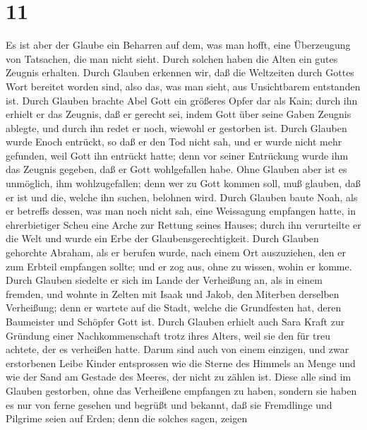 \hypertarget{section-10}{%
\section{11}\label{section-10}}

 Es ist aber der Glaube ein Beharren auf dem, was man
hofft, eine Überzeugung von Tatsachen, die man nicht sieht.
 Durch solchen haben die Alten ein gutes Zeugnis erhalten.
 Durch Glauben erkennen wir, daß die Weltzeiten durch
Gottes Wort bereitet worden sind, also das, was man sieht, aus
Unsichtbarem entstanden ist.  Durch Glauben brachte Abel
Gott ein größeres Opfer dar als Kain; durch ihn erhielt er das Zeugnis,
daß er gerecht sei, indem Gott über seine Gaben Zeugnis ablegte, und
durch ihn redet er noch, wiewohl er gestorben ist.  Durch
Glauben wurde Enoch entrückt, so daß er den Tod nicht sah, und er wurde
nicht mehr gefunden, weil Gott ihn entrückt hatte; denn vor seiner
Entrückung wurde ihm das Zeugnis gegeben, daß er Gott wohlgefallen habe.
 Ohne Glauben aber ist es unmöglich, ihm wohlzugefallen;
denn wer zu Gott kommen soll, muß glauben, daß er ist und die, welche
ihn suchen, belohnen wird.  Durch Glauben baute Noah, als
er betreffs dessen, was man noch nicht sah, eine Weissagung empfangen
hatte, in ehrerbietiger Scheu eine Arche zur Rettung seines Hauses;
durch ihn verurteilte er die Welt und wurde ein Erbe der
Glaubensgerechtigkeit.  Durch Glauben gehorchte Abraham,
als er berufen wurde, nach einem Ort auszuziehen, den er zum Erbteil
empfangen sollte; und er zog aus, ohne zu wissen, wohin er komme.
 Durch Glauben siedelte er sich im Lande der Verheißung
an, als in einem fremden, und wohnte in Zelten mit Isaak und Jakob, den
Miterben derselben Verheißung;  denn er wartete auf die
Stadt, welche die Grundfesten hat, deren Baumeister und Schöpfer Gott
ist.  Durch Glauben erhielt auch Sara Kraft zur Gründung
einer Nachkommenschaft trotz ihres Alters, weil sie den für treu
achtete, der es verheißen hatte.  Darum sind auch von
einem einzigen, und zwar erstorbenen Leibe Kinder entsprossen wie die
Sterne des Himmels an Menge und wie der Sand am Gestade des Meeres, der
nicht zu zählen ist.  Diese alle sind im Glauben
gestorben, ohne das Verheißene empfangen zu haben, sondern sie haben es
nur von ferne gesehen und begrüßt und bekannt, daß sie Fremdlinge und
Pilgrime seien auf Erden;  denn die solches sagen, zeigen
